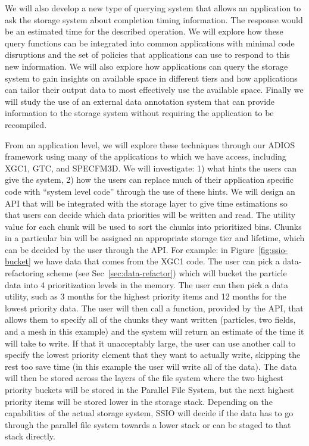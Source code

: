 We will also develop a new type of querying system that allows an application
to ask the storage system about completion timing information. The response
would be an estimated time for the described operation. We will explore
how these query functions can be integrated into common applications with
minimal code disruptions and the set of policies that applications can use to
respond to this new information. We will also explore how applications can
query the storage system to gain insights on available space in different tiers
and how applications can tailor their output data to most effectively use the available space.
Finally we will study the use of an external data annotation system that can
provide information to the storage system without requiring the application to
be recompiled. 

%
From an application level, we will explore these techniques through our ADIOS
framework using many of the applications to which we have access, including
XGC1, GTC, and SPECFM3D. We will investigate: 1) what hints the users can give
the system, 2) how the users can replace much of their
application specific code with
``system level code'' through the use of these hints.  We will design an API
that will be integrated with the storage layer to give time estimations so that
users can decide which data priorities will be written and read. The utility
value for each chunk will be used to sort the chunks into prioritized bins.
Chunks in a particular bin will be assigned an appropriate storage
 tier and lifetime, which can be decided by the user through the API.
For example: in Figure~\ref{fig:ssio-bucket} we have data that
comes from the XGC1 code.  The user can pick a data-refactoring scheme (see
Sec~\ref{sec:data-refactor}) which will bucket the particle data into 4
prioritization levels in the memory. The user can then pick a data utility, such as 3 months
for the highest priority items and 12 months for the lowest priority data.
The user will then call a function, provided by the API, that allows them
to specify all of the chunks they want
written (particles, two fields, and a mesh in this example) and the system
will return an estimate of the time it will take to write. If that it unacceptably large, the user can 
use another call to specify the lowest priority element that they want to actually write, 
skipping the rest too save time (in this
example the user will write all of the data). The data will then be stored
across the layers of the file system where the two highest priority buckets
will be stored in the Parallel File System, but the next highest priority items
will be stored lower in the storage stack. Depending on the capabilities of the actual storage system, 
SSIO will decide if the data has to go through the parallel file system 
towards a lower stack or can be staged to that stack directly. 
%



